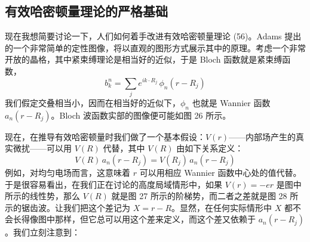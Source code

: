 



\subsection{有效哈密顿量理论的严格基础}

现在我想简要讨论一下，人们如何着手改进有效哈密顿量理论 (56)。Adams 提出的一个非常简单的定性图像，将以直观的图形方式展示其中的原理。考虑一个非常开放的晶格，其中紧束缚理论是相当好的近似，于是 Bloch 函数就是紧束缚函数，
\begin{equation*}
b^n_k = \sum_j e^{ik\cdot R_j}\,\phi_n(r - R_j)
\end{equation*}
我们假定交叠相当小，因而在相当好的近似下，$\phi_n$ 也就是 Wannier 函数 $a_n(r - R_j)$。Bloch 波函数实部的图像便可能如图 26 所示。


现在，在推导有效哈密顿量时我们做了一个基本假设：$V(r)$——内部场产生的真实微扰——可以用 $V(R)$ 代替，其中 $V(R)$ 由如下关系定义：
\begin{equation*}
V(R)\,a_n(r - R_j) = V(R_j)\,a_n(r - R_j)
\end{equation*}
例如，对均匀电场而言，这意味着 $r$ 可以用相应 Wannier 函数中心处的值代替。于是很容易看出，在我们正在讨论的高度局域情形中，如果 $V(r) = -er$ 是图中所示的线性势，那么 $V(R)$ 就是图 27 所示的阶梯势，而二者之差就是图 28 所示的锯齿波。让我们把这个差记为 $X = r - R$。显然，在任何实际情形中 $X$ 都不会长得像图中那样，但它总可以用这个差来定义，而这个差又依赖于 $a_n(r - R_j)$。我们立刻注意到：

